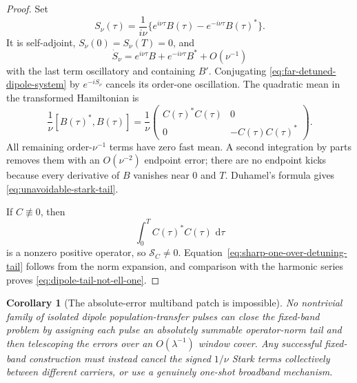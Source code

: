 \documentclass[11pt]{article}
\newtheorem{corollary}[theorem]{Corollary}
\theoremstyle{remark}
\newcommand{\dd}{\,\mathrm d}
\begin{document}
\begin{proof}
Set
\[
 S_\nu(\tau)=\frac1{i\nu}
 \{e^{i\nu\tau}B(\tau)-e^{-i\nu\tau}B(\tau)^*\}.
\]
It is self-adjoint, $S_\nu(0)=S_\nu(T)=0$, and
\[
 \dot S_\nu
 =e^{i\nu\tau}B+e^{-i\nu\tau}B^*
 +O(\nu^{-1})
\]
with the last term oscillatory and containing $B'$.  Conjugating
\eqref{eq:far-detuned-dipole-system} by $e^{-iS_\nu}$ cancels its order-one
oscillation.  The quadratic mean in the transformed Hamiltonian is
\[
 \frac1{\nu}[B(\tau)^*,B(\tau)]
 =
 \frac1{\nu}
 \begin{pmatrix}
 C(\tau)^*C(\tau)&0\\
 0&-C(\tau)C(\tau)^*
 \end{pmatrix}.
\]
All remaining order-$\nu^{-1}$ terms have zero fast mean.  A second
integration by parts removes them with an $O(\nu^{-2})$ endpoint error;
there are no endpoint kicks because every derivative of $B$ vanishes near
$0$ and $T$.  Duhamel's formula gives
\eqref{eq:unavoidable-stark-tail}.

If $C\not\equiv0$, then
\[
 \int_0^T C(\tau)^*C(\tau)\,\dd\tau
\]
is a nonzero positive operator, so $\mathcal S_C\neq0$.
Equation~\eqref{eq:sharp-one-over-detuning-tail} follows from the norm
expansion, and comparison with the harmonic series proves
\eqref{eq:dipole-tail-not-ell-one}.
\end{proof}

\begin{corollary}[The absolute-error multiband patch is impossible]
\label{cor:absolute-multiband-tail-no-go}
No nontrivial family of isolated dipole population-transfer pulses can close
the fixed-band problem by assigning each pulse an absolutely summable
operator-norm tail and then telescoping the errors over an
$O(\lambda^{-1})$ window cover.  Any successful fixed-band construction must
instead cancel the signed $1/\nu$ Stark terms collectively between different
carriers, or use a genuinely one-shot broadband mechanism.
\end{corollary}
\end{document}
